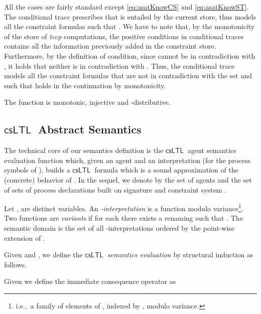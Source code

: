 \documentclass[american]{new_tlp}
\newcommand*{\csltl}[1][]{\ensuremath{\textsf{csLTL}_{#1}}}
\newcommand*{\tccp}{\textit{tccp}}
\providecommand*{\ie}   {i.e.,}
\begin{document}
All the cases are fairly standard except \eqref{eq:asatKnowCS} and
\eqref{eq:asatKnowST}.
The conditional trace  prescribes that
 is entailed by the current store, thus  models all the
constraint formulas  such that .  We have to note that,
by the monotonicity of the store of \tccp{} computations, the positive
conditions in conditional traces contains all the information previously
added in the constraint store.
Furthermore, by the definition of condition, since  cannot be in
contradiction with , it holds that neither  is in contradiction
with .  Thus, the conditional trace 
models all the constraint formulas  that are not in contradiction with
the set  and such that  holds in the continuation  by
monotonicity.
\begin{lemma}\label{lem:FtoM}
    The function  is monotonic, injective
    and -distributive.
\end{lemma}


\subsection{\csltl\ Abstract Semantics}


The technical core of our semantics definition is the \csltl\ agent
semantics evaluation function  which, given an agent  and an
interpretation  (for the process symbols of ), builds a \csltl\
formula which is a sound approximation of the (concrete) behavior of .
In the sequel, we denote by  the set of agents and  the
set of sets of process declarations built on signature  and
constraint system .
\begin{definition}
    \label{def:interpC}
    Let ,  are distinct
    variables.
    An \emph{-interpretation} is a function  modulo
    variance\footnote{\ie\ a family of elements of , indexed by
    , modulo variance.  }.  Two functions 
    are \emph{variants}
    if for each  there exists a renaming  such that
    .
    The semantic domain  is the set of all
    -interpretations ordered by the point-wise extension of .
\end{definition}    
\begin{definition}[\csltl\ Semantics]
    \label{def:semFAa} 
    Given  and , we define the \emph{\csltl\
    semantics evaluation}  by structural induction as
    follows.
    
    Given  we define the immediate consequence operator
     as
    
\end{definition}
\end{document}
